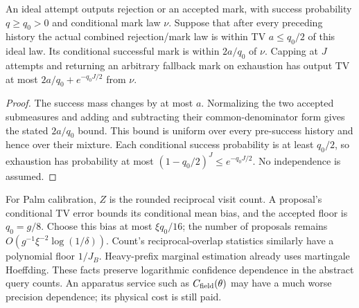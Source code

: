 \begin{lemma}\label{lem:accept}
An ideal attempt outputs rejection or an accepted mark, with success
probability $q\ge q_0>0$ and conditional mark law $\nu$. Suppose that
after every preceding history the actual combined rejection/mark law
is within TV $a\le q_0/2$ of this ideal law. Its conditional successful
mark is within $2a/q_0$ of $\nu$. Capping at $J$ attempts and returning
an arbitrary fallback mark on exhaustion has output TV at most
$2a/q_0+e^{-q_0J/2}$ from $\nu$.
\end{lemma}
\begin{proof}
The success mass changes by at most $a$. Normalizing the two accepted
submeasures and adding and subtracting their common-denominator form
gives the stated $2a/q_0$ bound. This bound is uniform over every
pre-success history and hence over their mixture. Each conditional
success probability is at least $q_0/2$, so exhaustion has probability
at most $(1-q_0/2)^J\le e^{-q_0J/2}$. No independence is assumed.
\end{proof}

For Palm calibration, $Z$ is the rounded reciprocal visit count. A
proposal's conditional TV error bounds its conditional mean bias, and
the accepted floor is $q_0=g/8$. Choose this bias at most
$\xi q_0/16$; the number of proposals remains
$O(g^{-1}\xi^{-2}\log(1/\delta))$. Count's reciprocal-overlap
statistics similarly have a polynomial floor $1/J_B$. Heavy-prefix
marginal estimation already uses martingale Hoeffding. These facts
preserve logarithmic confidence dependence in the abstract query counts.
An apparatus service such as $C_{\rm field}(\theta)$ may have a much
worse precision dependence; its physical cost is still paid.

